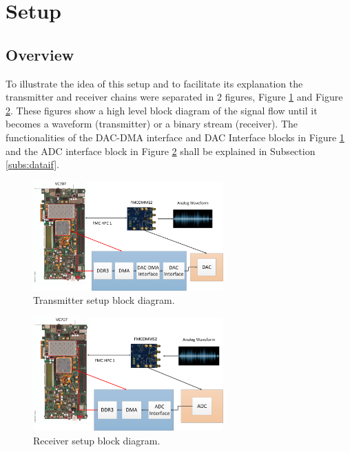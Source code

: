\section{Setup}
\label{impl:setup}

\subsection{Overview}

To illustrate the idea of this setup and to facilitate its explanation the
transmitter and receiver chains were separated in 2 figures, Figure
\ref{fig:txsetup} and Figure \ref{fig:rxsetup}. These figures show a high level
block diagram of the signal flow until it becomes a waveform (transmitter) or a
binary stream (receiver). The functionalities of the  DAC-DMA interface and DAC
Interface blocks in Figure \ref{fig:txsetup} and the ADC interface block in
Figure \ref{fig:rxsetup} shall be explained in Subsection \ref{subs:dataif}.

\begin{figure}[htbp]
    \centering
    \includegraphics[width=0.65\textwidth]{./figures/tx_setup}
    \caption{ Transmitter setup block diagram.
    \label{fig:txsetup}}
\end{figure}

\begin{figure}[htbp]
    \centering
    \includegraphics[width=0.65\textwidth]{./figures/rx_setup}
    \caption{ Receiver setup block diagram.
    \label{fig:rxsetup}}
\end{figure}



